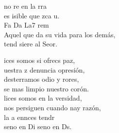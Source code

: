 \documentclass[12pt]{article}
\begin{document}
\begin{multicols*}{2}
\begin{cancion}[Bienaventuranzas][Kairoi]
\begin{chorus}
	no re en la rra\\
	es isible que zca u.\\
  Fa      Da    La7       rem\\
Aquel que da su vida para los demás,\\
	tend siere al Seor.\\
	\end{chorus}%
	ices somos si ofrecs paz,\\
	uestra z denuncia  opresión,\\
	desterramos odio y rores,\\
	se mas limpio nuestro corón.\\
	lices somos en la versidad,\\
	nos persiguen cuando nay razón,\\
	la a ennces tendr\\
	seno en Di seno en Ds.\\
\end{cancion}%


\end{multicols*}
\end{document}

